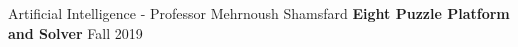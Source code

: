   \begin{cventries}

    \cventry
    {Artificial Intelligence - Professor Mehrnoush Shamsfard}
    {\textbf {Eight Puzzle Platform and Solver}}
    {}
    {Fall 2019}
    {}
    
\end{cventries}